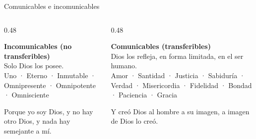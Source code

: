 \begin{frame}{Comunicables e incomunicables}
\begin{columns}[t,onlytextwidth]
\begin{column}{0.48\textwidth}
\begin{tcolorbox}[colback=azulp,colframe=azulp,coltext=white,boxrule=0pt,arc=3pt,fontupper=\small]
\textbf{Incomunicables (no transferibles)}\\[3pt] Solo Dios los posee.\\[3pt]
{\footnotesize Uno · Eterno · Inmutable · Omnipresente · Omnipotente · Omnisciente}
\end{tcolorbox}
\begin{cita}Porque yo soy Dios, y no hay otro Dios, y nada hay semejante a mí.\end{cita}
\end{column}
\begin{column}{0.48\textwidth}
\begin{tcolorbox}[colback=azulcl,colframe=azulp,boxrule=0.8pt,arc=3pt,fontupper=\small]
\textbf{Comunicables (transferibles)}\\[3pt] Dios los refleja, en forma limitada, en el ser humano.\\[3pt]
{\footnotesize Amor · Santidad · Justicia · Sabiduría · Verdad · Misericordia · Fidelidad · Bondad · Paciencia · Gracia}
\end{tcolorbox}
\begin{cita}Y creó Dios al hombre a su imagen, a imagen de Dios lo creó.\end{cita}
\end{column}
\end{columns}
\end{frame}

